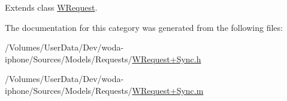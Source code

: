 Extends class \hyperlink{interface_w_request_a5a9316b6ca67b92fffca5e47d283fc49}{W\-Request}.



The documentation for this category was generated from the following files\-:\begin{DoxyCompactItemize}
\item 
/\-Volumes/\-User\-Data/\-Dev/woda-\/iphone/\-Sources/\-Models/\-Requests/\hyperlink{_w_request_09_sync_8h}{W\-Request+\-Sync.\-h}\item 
/\-Volumes/\-User\-Data/\-Dev/woda-\/iphone/\-Sources/\-Models/\-Requests/\hyperlink{_w_request_09_sync_8m}{W\-Request+\-Sync.\-m}\end{DoxyCompactItemize}
